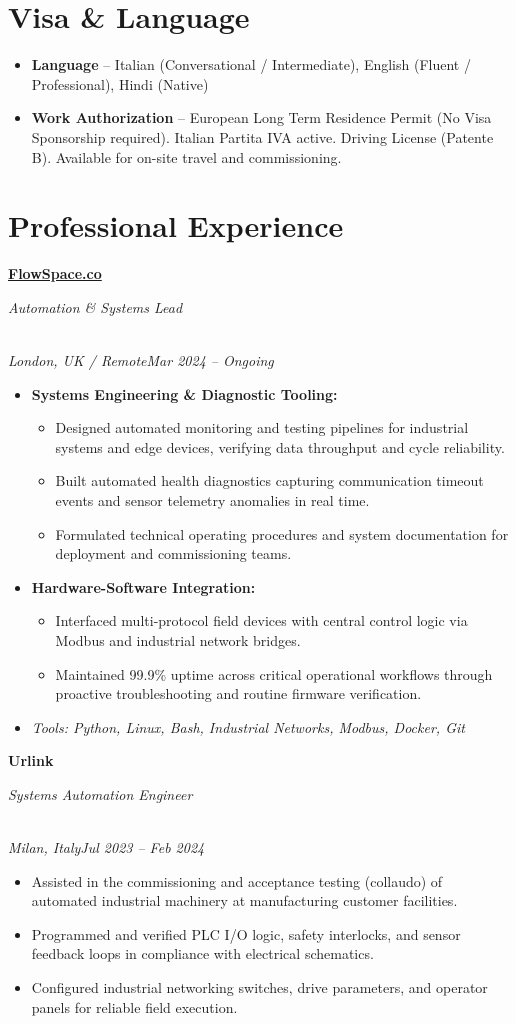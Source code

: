 \documentclass[a4paper,10pt]{article}
\newcommand{\role}[4]{\vspace{3pt}\noindent\hspace{0.6em}\parbox[t]{0.38\textwidth}{\raggedright\textbf{#1}}\hfill\parbox[t]{0.58\textwidth}{\raggedleft\textit{#2}}\\{\textit{#3}\hfill\textit{#4}}\vspace{1pt}}
\begin{document}
\section{Visa \& Language}
\begin{itemize}
\item \textbf{Language} -- Italian (Conversational / Intermediate), English (Fluent / Professional), Hindi (Native)
\item \textbf{Work Authorization} -- European Long Term Residence Permit (No Visa Sponsorship required). Italian Partita IVA active. Driving License (Patente B). Available for on-site travel and commissioning.
\end{itemize}

\section{Professional Experience}
\role{\href{https://flowspace.co}{FlowSpace.co}}{Automation \& Systems Lead}{London, UK / Remote}{Mar 2024 -- Ongoing}
\begin{itemize}
\item \textbf{Systems Engineering \& Diagnostic Tooling:}
\begin{itemize}[label=--]
\item Designed automated monitoring and testing pipelines for industrial systems and edge devices, verifying data throughput and cycle reliability.
\item Built automated health diagnostics capturing communication timeout events and sensor telemetry anomalies in real time.
\item Formulated technical operating procedures and system documentation for deployment and commissioning teams.
\end{itemize}
\item \textbf{Hardware-Software Integration:}
\begin{itemize}[label=--]
\item Interfaced multi-protocol field devices with central control logic via Modbus and industrial network bridges.
\item Maintained 99.9\% uptime across critical operational workflows through proactive troubleshooting and routine firmware verification.
\end{itemize}
\item \textit{Tools: Python, Linux, Bash, Industrial Networks, Modbus, Docker, Git}
\end{itemize}

\role{Urlink}{Systems Automation Engineer}{Milan, Italy}{Jul 2023 -- Feb 2024}
\begin{itemize}
\item Assisted in the commissioning and acceptance testing (collaudo) of automated industrial machinery at manufacturing customer facilities.
\item Programmed and verified PLC I/O logic, safety interlocks, and sensor feedback loops in compliance with electrical schematics.
\item Configured industrial networking switches, drive parameters, and operator panels for reliable field execution.
\end{itemize}
\end{document}
